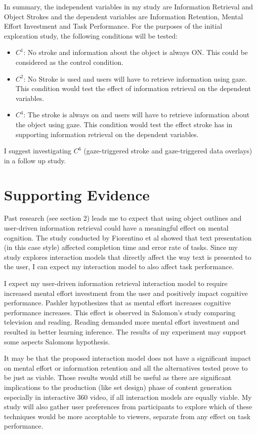\documentclass{article}
\begin{document}
{In summary, the independent variables in my study are Information Retrieval and Object Strokes and the dependent variables are Information Retention, Mental Effort Investment and Task Performance. For the purposes of the initial exploration study, the following conditions will be tested:
\begin{itemize}
\item $C^1$: No stroke and information about the object is always ON. This could be considered as the control condition.
\item $C^2$: No Stroke is used and users will have to retrieve information using gaze. This condition would test the effect of information retrieval on the dependent variables. 
\item $C^4$: The stroke is always on and users will have to retrieve information about the object using gaze. This condition would test the effect stroke has in supporting information retrieval on the dependent variables. 
\end{itemize}
I suggest investigating $C^6$ (gaze-triggered stroke and gaze-triggered data overlays) in a follow up study.

\section{Supporting Evidence} \label{Evidence}
Past research (see section 2) leads me to expect that using object outlines and user-driven information retrieval could have a meaningful  effect on mental cognition. The study conducted by Fiorentino et al \cite{fiorentino2013augmented} showed that text presentation (in this case style) affected completion time and error rate of tasks. Since my study explores interaction models that directly affect the way text is presented to the user, I can expect my interaction model to also affect task performance.

I expect my user-driven information retrieval interaction model to require increased mental effort investment from the user and positively impact cognitive performance. Pashler \cite{pashler1998psychology} hypothesizes that as mental effort increases cognitive performance increases. This effect is observed in Salomon's study \cite{salomon1984television} comparing television and reading. Reading demanded more mental effort investment and resulted in better learning inference. The results of my experiment may support some aspects Salomons hypothesis.

It may be that the proposed interaction model does not have a significant impact on mental effort or information retention and all the alternatives tested prove to be just as viable. Those results would still be useful as there are significant implications to the production (like set design) phase of content generation especially in interactive 360 video, if all interaction models are equally viable. My study will also gather user preferences from participants to explore which of these techniques would be more acceptable to viewers, separate from any effect on task performance.

}
\end{document}
